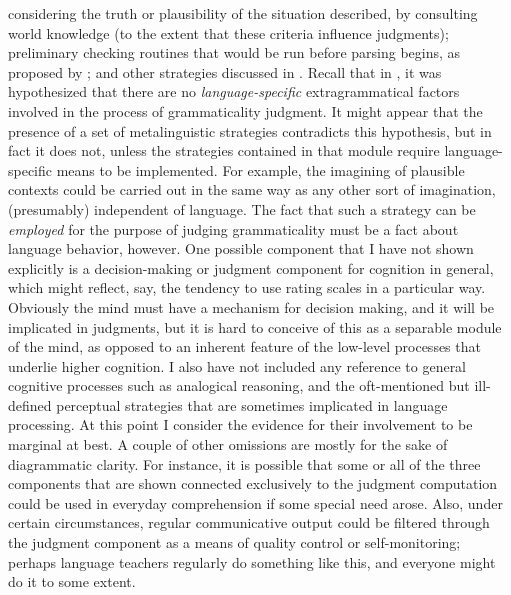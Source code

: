 considering the truth or plausibility of the situation described, by consulting world knowledge (to the extent that these criteria influence judgments); preliminary checking routines that would be run before parsing begins, as proposed by \citet{LeveltEtAl1977}; and other strategies discussed in . Recall that in , it was hypothesized that there are no \textit{language-specific} extragrammatical factors involved in the process of grammaticality judgment. It might appear that the presence of a set of metalinguistic strategies contradicts this hypothesis, but in fact it does not, unless the strategies contained in that module require language-specific means to be implemented. For example, the imagining of plausible contexts could be carried out in the same way as any other sort of imagination, (presumably) independent of language. The fact that such a strategy can be \textit{employed} for the purpose of judging grammaticality must be a fact about language behavior, however. One possible component that I have not shown explicitly is a decision-making or judgment component for cognition in general, which might reflect, say, the tendency to use rating scales in a particular way. Obviously the mind must have a mechanism for decision making, and it will be implicated in judgments, but it is hard to conceive of this as a separable module of the mind, as opposed to an inherent feature of the low-level processes that underlie higher cognition. I also have not included any reference to general cognitive processes such as analogical reasoning, and the oft-mentioned but ill-defined perceptual strategies that are sometimes implicated in language processing. At this point I consider the evidence for their involvement to be marginal at best. A couple of other omissions are mostly for the sake of diagrammatic clarity. For instance, it is possible that some or all of the three components that are shown connected exclusively to the judgment computation could be used in everyday comprehension if some special need arose. Also, under certain circumstances, regular communicative output could be filtered through the judgment component as a means of quality control or self-monitoring; perhaps language teachers regularly do something like this, and everyone might do it to some extent.

